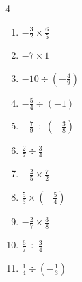 \begin{multicols}{4}
\begin{enumerate}

  \item $\displaystyle -\frac{3}{2}\times{}\frac{6}{5}$


  \item $\displaystyle -7\times{}1$

        \phantom{$\displaystyle =-7$}

  \item $\displaystyle -10\div{}\left(-\frac{4}{9}\right)$


  \item $\displaystyle -\frac{5}{4}\div{}\left(-1\right)$


\columnbreak %

  \item $\displaystyle -\frac{7}{9}\div{}\left(-\frac{3}{8}\right)$


  \item $\displaystyle \frac{2}{7}\div{}\frac{3}{4}$


  \item $\displaystyle -\frac{2}{5}\times{}\frac{7}{2}$


  \item $\displaystyle \frac{5}{3}\times{}\left(-\frac{5}{4}\right)$


  \item $\displaystyle -\frac{2}{7}\times{}\frac{3}{8}$


  \item $\displaystyle \frac{6}{7}\div{}\frac{3}{4}$


  \item $\displaystyle \frac{1}{4}\div{}\left(-\frac{1}{3}\right)$



\end{enumerate}
\end{multicols}
